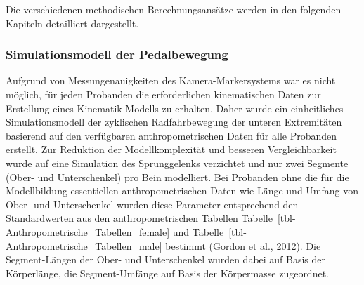 \documentclass[
  letterpaper,
  DIV=11]{scrartcl}
\begin{document}
Die verschiedenen methodischen Berechnungsansätze werden in den
folgenden Kapiteln detailliert dargestellt.

\subsubsection{Simulationsmodell der
Pedalbewegung}\label{simulationsmodell-der-pedalbewegung}

Aufgrund von Messungenauigkeiten des Kamera-Markersystems war es nicht
möglich, für jeden Probanden die erforderlichen kinematischen Daten zur
Erstellung eines Kinematik-Modells zu erhalten. Daher wurde ein
einheitliches Simulationsmodell der zyklischen Radfahrbewegung der
unteren Extremitäten basierend auf den verfügbaren anthropometrischen
Daten für alle Probanden erstellt. Zur Reduktion der Modellkomplexität
und besseren Vergleichbarkeit wurde auf eine Simulation des
Sprunggelenks verzichtet und nur zwei Segmente (Ober- und Unterschenkel)
pro Bein modelliert. Bei Probanden ohne die für die Modellbildung
essentiellen anthropometrischen Daten wie Länge und Umfang von Ober- und
Unterschenkel wurden diese Parameter entsprechend den Standardwerten aus
den anthropometrischen Tabellen
Tabelle~\ref{tbl-Anthropometrische_Tabellen_female} und
Tabelle~\ref{tbl-Anthropometrische_Tabellen_male} bestimmt (Gordon et
al., 2012). Die Segment-Längen der Ober- und Unterschenkel wurden dabei
auf Basis der Körperlänge, die Segment-Umfänge auf Basis der Körpermasse
zugeordnet.
\end{document}
